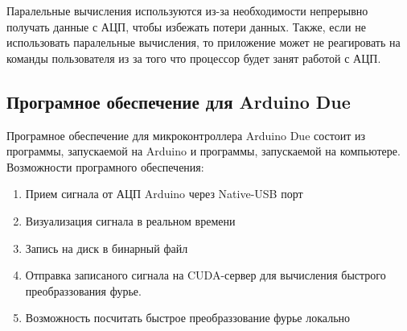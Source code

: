 \documentclass[../paper.tex]{subfiles}
\begin{document}
Паралельные вычисления используются из-за необходимости непрерывно получать данные с АЦП, чтобы избежать потери данных. Также, если не использовать паралельные вычисления, то приложение может не реагировать на команды пользователя из за того что процессор будет занят работой с АЦП.

\subsection{Програмное обеспечение для Arduino Due}
Програмное обеспечение для микроконтроллера Arduino Due состоит из программы, запускаемой на Arduino и программы, запускаемой на компьютере. 
Возможности програмного обеспечения:
\begin{enumerate}
  \item Прием сигнала от АЦП Arduino через Native-USB порт
  \item Визуализация сигнала в реальном времени
  \item Запись на диск в бинарный файл
  \item Отправка записаного сигнала на CUDA-сервер для вычисления быстрого преобраззования фурье.
  \item Возможность посчитать быстрое преобраззование фурье локально
\end{enumerate}
\end{document}
